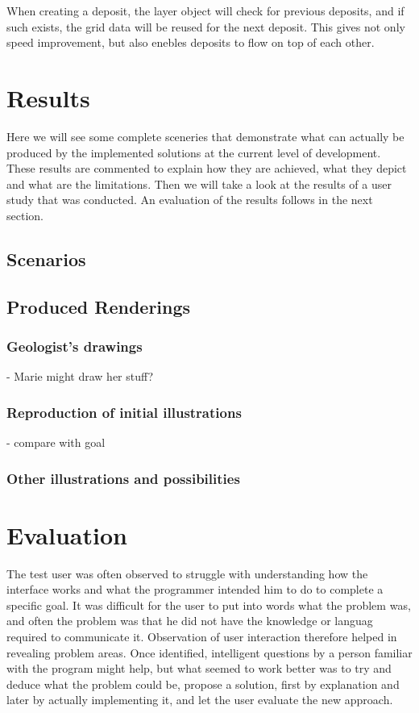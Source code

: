 \documentclass[a4paper,12pt]{report}
\begin{document}
When creating a deposit, the layer object will check for previous deposits, and if such exists, the grid data will be reused for the next deposit. This gives not only speed improvement, but also enebles deposits to flow on top of each other.

\clearpage
\chapter{Results}
Here we will see some complete sceneries that demonstrate what can actually be produced by the implemented solutions at the current level of development. These results are commented to explain how they are achieved, what they depict and what are the limitations. Then we will take a look at the results of a user study that was conducted. An evaluation of the results follows in the next section.
\label{sec:results}

\section{Scenarios}


\section{Produced Renderings}
\subsection{Geologist's drawings}
- Marie might draw her stuff?
\subsection{Reproduction of initial illustrations}
- compare with goal\\
\subsection{Other illustrations and possibilities}

\clearpage
\chapter{Evaluation}
\label{sec:eval}
The test user was often observed to struggle with understanding how the interface works and what the programmer intended him to do to complete a specific goal. It was difficult for the user to put into words what the problem was, and often the problem was that he did not have the knowledge or languag required to communicate it. Observation of user interaction therefore helped in revealing problem areas. Once identified, intelligent questions by a person familiar with the program might help, but what seemed to work better was to try and deduce what the problem could be, propose a solution, first by explanation and later by actually implementing it, and let the user evaluate the new approach.
\end{document}
